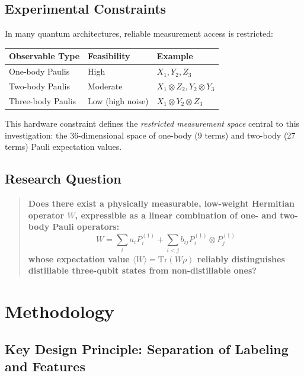 \documentclass[11pt,a4paper]{article}
\begin{document}
\subsection{Experimental Constraints}

In many quantum architectures, reliable measurement access is restricted:
\begin{center}
\begin{tabular}{lll}
\toprule
\textbf{Observable Type} & \textbf{Feasibility} & \textbf{Example} \\
\midrule
One-body Paulis & High & $X_1, Y_2, Z_3$ \\
Two-body Paulis & Moderate & $X_1 \otimes Z_2, Y_2 \otimes Y_3$ \\
Three-body Paulis & Low (high noise) & $X_1 \otimes Y_2 \otimes Z_3$ \\
\bottomrule
\end{tabular}
\end{center}

This hardware constraint defines the \emph{restricted measurement space} central to this investigation: the 36-dimensional space of one-body (9 terms) and two-body (27 terms) Pauli expectation values.

\subsection{Research Question}

\begin{quote}
\textbf{Does there exist a physically measurable, low-weight Hermitian operator $W$, expressible as a linear combination of one- and two-body Pauli operators:}
\begin{equation}
W = \sum_{i} a_i P_i^{(1)} + \sum_{i<j} b_{ij} P_i^{(1)} \otimes P_j^{(1)}
\end{equation}
\textbf{whose expectation value $\langle W \rangle = \text{Tr}(W\rho)$ reliably distinguishes distillable three-qubit states from non-distillable ones?}
\end{quote}

\section{Methodology}

\subsection{Key Design Principle: Separation of Labeling and Features}
\end{document}
